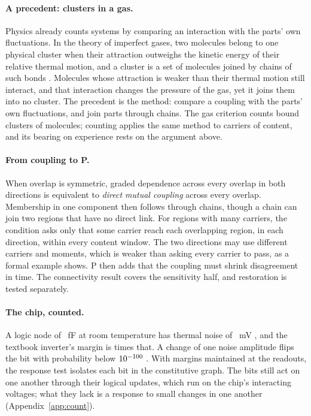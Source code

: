 \documentclass[12pt]{article}
\begin{document}
\paragraph{A precedent: clusters in a gas.} Physics already counts systems by
comparing an interaction with the parts' own fluctuations. In the theory of
imperfect gases, two molecules belong to one physical cluster when their
attraction outweighs the kinetic energy of their relative thermal motion, and a
cluster is a set of molecules joined by chains of such bonds
\citep{hill1955,sator2003}. Molecules whose attraction is weaker than their
thermal motion still interact, and that interaction changes the pressure of the
gas, yet it joins them into no cluster. The precedent is the method: compare a
coupling with the parts' own fluctuations, and join parts through chains. The
gas criterion counts bound clusters of molecules; counting applies the same
method to carriers of content, and its bearing on experience rests on the
argument above.

\paragraph{From coupling to P.} When overlap is symmetric, graded dependence
across every overlap in both directions is equivalent to \emph{direct mutual
coupling} across every overlap. Membership in one component then follows
through chains, though a chain can join two regions that have no direct link.
For regions with many carriers, the condition asks only that some carrier reach
each overlapping region, in each direction, within every content window. The
two directions may use different carriers and moments, which is weaker than
asking every carrier to pass, as a formal example shows. P then adds that the
coupling must shrink disagreement in time. The connectivity result covers the
sensitivity half, and restoration is tested separately.

\paragraph{The chip, counted.} A logic node of \ueNodeCapFf{}~fF at room
temperature has thermal noise of \ueThermalNoiseMv{}~mV
\citep{johnson1928,nyquist1928}, and the textbook inverter's margin is
\ueMarginToNoise{} times that. A change of one noise amplitude flips the bit with
probability below $10^{-100}$ \citep{kish2002}. With margins maintained
at the readouts, the response test isolates each bit in the constitutive graph.
The bits still act on one another through their logical updates, which run on
the chip's interacting voltages; what they lack is a response to small changes
in one another (Appendix~\ref{app:count}).
\end{document}
